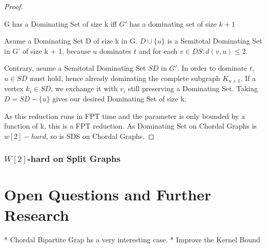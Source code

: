 \begin{proof}
    \begin{corollary}
    G has a Dominating Set of size k iff $G'$ has a dominating set of size $k+1$
    \end{corollary}
    \begin{subproof}
    Asume a Dominating Set D of size k in G. $D \cup \{u\}$ is a Semitotal Dominating Set in G' of size k + 1, because $u$ dominates $t$ and for each $v \in DS: d(v, u) \leq 2$.

    Contrary, asume a Semitotal Dominating Set $SD$ in $G'$. In order to dominate $t$, $u \in SD$ must hold, hence already dominating the complete subgraph $K_{n+1}$. If a vertex $k_i \in SD$, we exchange it with $v_i$ still preserving a Dominating Set. Taking $D = SD - \{ u \}$ gives our desired Dominating Set of size k.
    \end{subproof}
    As this reduction runs in FPT time and the parameter is only bounded by a function of k, this is a FPT reduction. As Dominating Set on Chordal Graphs is $w[2]-hard$, so is SDS on Chordal Graphs.

\end{proof}

\subsection{\hmath $W[2]$-hard on Split Graphs}

\chapter{Open Questions and Further Research}

* Chordal Bipartite Grap hs a very interesting case.
* Improve the Kernel Bound

